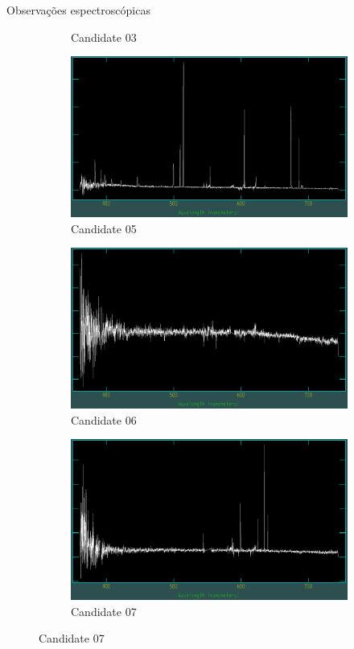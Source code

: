 \begin{frame}[c]{Observações espectroscópicas}
\begin{figure}
\begin{subfigure}[b]{0.31\textwidth}
        \caption{Candidate 03}
    \end{subfigure}
    \begin{subfigure}[b]{0.31\textwidth}
        \includegraphics[width=\textwidth]{images/espectros/UCG05.png}
        \caption{Candidate 05}
    \end{subfigure}
    \begin{subfigure}[b]{0.31\textwidth}
        \includegraphics[width=\textwidth]{images/espectros/UCG06.png}
        \caption{Candidate 06}
    \end{subfigure}
    \begin{subfigure}[b]{0.31\textwidth}
        \includegraphics[width=\textwidth]{images/espectros/UCG07.png}
        \caption{Candidate 07}
    \end{subfigure}
\end{figure}
\end{frame}

